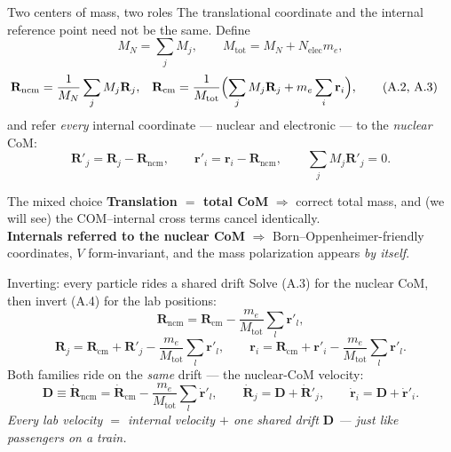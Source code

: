 \documentclass[aspectratio=169,10pt]{beamer}
\newcommand{\stagenum}{0}
\newcommand{\setstage}[1]{\renewcommand{\stagenum}{#1}}
\begin{document}
\begin{frame}{Two centers of mass, two roles}
\setstage{1}
The translational coordinate and the internal reference point \alert{need not be the same}. Define
\begin{equation*}
M_N=\sum_jM_j,\qquad M_{\mathrm{tot}}=M_N+N_{\mathrm{elec}}m_e,
\end{equation*}
\begin{align*}
\mathbf{R}_{\mathrm{ncm}} &= \frac{1}{M_N}\sum_j M_j\mathbf{R}_j,
&\mathbf{R}_{\mathrm{cm}} &= \frac{1}{M_{\mathrm{tot}}}\Bigl(\sum_j M_j\mathbf{R}_j+m_e\sum_i\mathbf{r}_i\Bigr), \tag{A.2, A.3}
\end{align*}
and refer \emph{every} internal coordinate --- nuclear and electronic --- to the \emph{nuclear} CoM:
\begin{equation*}
\mathbf{R}'_j = \mathbf{R}_j-\mathbf{R}_{\mathrm{ncm}},
\qquad\mathbf{r}'_i = \mathbf{r}_i-\mathbf{R}_{\mathrm{ncm}},\qquad \textstyle\sum_j M_j\mathbf{R}'_j=0. \tag{A.4}
\end{equation*}
\begin{block}{The mixed choice}
\textbf{Translation $=$ total CoM} $\Rightarrow$ correct total mass, and (we will see) the COM--internal cross terms cancel identically.\\
\textbf{Internals referred to the nuclear CoM} $\Rightarrow$ Born--Oppenheimer-friendly coordinates, $V$ form-invariant, and the mass polarization appears \emph{by itself}.
\end{block}
\end{frame}

\begin{frame}{Inverting: every particle rides a shared drift}
\setstage{1}
Solve (A.3) for the nuclear CoM, then invert (A.4) for the lab positions:
\begin{equation*}
\mathbf R_{\mathrm{ncm}} = \mathbf R_{\mathrm{cm}} - \frac{m_e}{M_{\mathrm{tot}}}\sum_l\mathbf r'_l , \tag{A.5}
\end{equation*}
\begin{equation*}
\mathbf R_j = \mathbf R_{\mathrm{cm}}+\mathbf R'_j-\frac{m_e}{M_{\mathrm{tot}}}\sum_l\mathbf r'_l,
\qquad
\mathbf r_i = \mathbf R_{\mathrm{cm}}+\mathbf r'_i-\frac{m_e}{M_{\mathrm{tot}}}\sum_l\mathbf r'_l . \tag{A.6}
\end{equation*}
Both families ride on the \emph{same} drift --- the nuclear-CoM velocity:
\begin{equation*}
\boxed{\;\mathbf D \equiv \dot{\mathbf R}_{\mathrm{ncm}} = \dot{\mathbf R}_{\mathrm{cm}}-\frac{m_e}{M_{\mathrm{tot}}}\sum_l\dot{\mathbf r}'_l,
\qquad \dot{\mathbf R}_j=\mathbf D+\dot{\mathbf R}'_j,\qquad \dot{\mathbf r}_i=\mathbf D+\dot{\mathbf r}'_i.\;} \tag{A.7}
\end{equation*}
\centering\itshape Every lab velocity $=$ internal velocity $+$ one shared drift $\mathbf D$ --- just like passengers on a train.
\end{frame}
\end{document}

